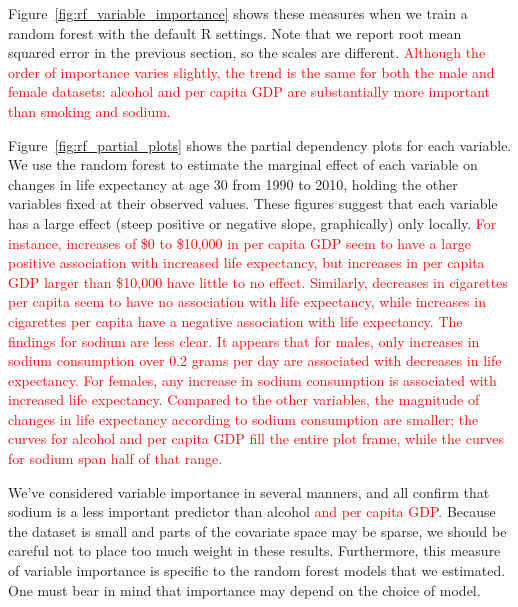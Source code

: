 \documentclass[11pt]{article}\usepackage[]{graphicx}\usepackage[]{color}
\begin{document}
Figure~\ref{fig:rf_variable_importance} shows these measures when we train a random forest with the default R settings.
Note that we report root mean squared error in the previous section, so the scales are different.
\textcolor{red}{Although the order of importance varies slightly, the trend is the same for both the male and female datasets: alcohol and per capita GDP are substantially more important than smoking and sodium.}

Figure~\ref{fig:rf_partial_plots} shows the partial dependency plots for each variable.
We use the random forest to estimate the marginal effect of each variable on changes in life expectancy at age 30 from 1990 to 2010, holding the other variables fixed at their observed values.
These figures suggest that each variable has a large effect (steep positive or negative slope, graphically) only locally.
\textcolor{red}{For instance, increases of \$0 to \$10,000 in per capita GDP seem to have a large positive association with increased life expectancy, but increases in per capita GDP larger than \$10,000 have little to no effect.
Similarly, decreases in cigarettes per capita seem to have no association with life expectancy, while increases in cigarettes per capita have a negative association with life expectancy.
The findings for sodium are less clear.
It appears that for males, only increases in sodium consumption over 0.2 grams per day are associated with decreases in life expectancy.
For females, any increase in sodium consumption is associated with increased life expectancy.
Compared to the other variables, the magnitude of changes in life expectancy according to sodium consumption are smaller; the curves for alcohol and per capita GDP fill the entire plot frame, while the curves for sodium span half of that range.
}

We've considered variable importance in several manners, and all confirm that sodium is a less important predictor than alcohol \textcolor{red}{and per capita GDP.}
Because the dataset is small and parts of the covariate space may be sparse, we should be careful not to place too much weight in these results.
Furthermore, this measure of variable importance is specific to the random forest models that we estimated.
One must bear in mind that importance may depend on the choice of model.
\end{document}
